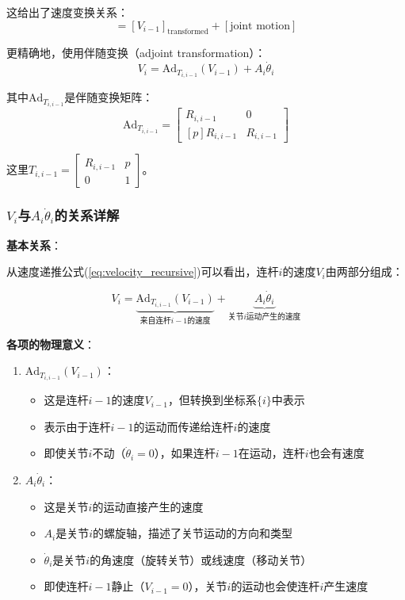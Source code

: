 \documentclass[12pt,a4paper]{article}
\begin{document}
这给出了速度变换关系：
\begin{equation}
[V_i] = [V_{i-1}]_{\text{transformed}} + [\text{joint motion}]
\end{equation}

更精确地，使用伴随变换（adjoint transformation）：
\begin{equation}
V_i = \text{Ad}_{T_{i,i-1}}(V_{i-1}) + A_i \dot{\theta}_i
\label{eq:velocity_recursive}
\end{equation}

其中$\text{Ad}_{T_{i,i-1}}$是伴随变换矩阵：
\begin{equation}
\text{Ad}_{T_{i,i-1}} = \begin{bmatrix}
R_{i,i-1} & 0 \\
[p]R_{i,i-1} & R_{i,i-1}
\end{bmatrix}
\end{equation}

这里$T_{i,i-1} = \begin{bmatrix} R_{i,i-1} & p \\ 0 & 1 \end{bmatrix}$。

\subsubsection{$V_i$与$A_i \dot{\theta}_i$的关系详解}

\textbf{基本关系}：

从速度递推公式(\ref{eq:velocity_recursive})可以看出，连杆$i$的速度$V_i$由两部分组成：

\begin{equation}
V_i = \underbrace{\text{Ad}_{T_{i,i-1}}(V_{i-1})}_{\text{来自连杆$i-1$的速度}} + \underbrace{A_i \dot{\theta}_i}_{\text{关节$i$运动产生的速度}}
\label{eq:V_i_components}
\end{equation}

\textbf{各项的物理意义}：

\begin{enumerate}
\item \textbf{$\text{Ad}_{T_{i,i-1}}(V_{i-1})$}：
\begin{itemize}
\item 这是连杆$i-1$的速度$V_{i-1}$，但转换到坐标系$\{i\}$中表示
\item 表示由于连杆$i-1$的运动而传递给连杆$i$的速度
\item 即使关节$i$不动（$\dot{\theta}_i = 0$），如果连杆$i-1$在运动，连杆$i$也会有速度
\end{itemize}

\item \textbf{$A_i \dot{\theta}_i$}：
\begin{itemize}
\item 这是关节$i$的运动直接产生的速度
\item $A_i$是关节$i$的螺旋轴，描述了关节运动的方向和类型
\item $\dot{\theta}_i$是关节$i$的角速度（旋转关节）或线速度（移动关节）
\item 即使连杆$i-1$静止（$V_{i-1} = 0$），关节$i$的运动也会使连杆$i$产生速度
\end{itemize}
\end{enumerate}
\end{document}
